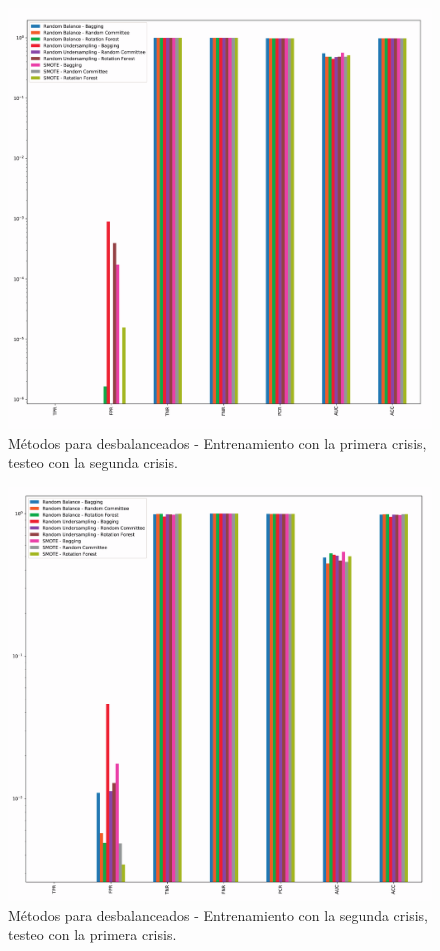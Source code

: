\documentclass[a4paper,12pt,twoside,oldfontcommands]{memoir}
\begin{document}
\begin{figure}
    \centering
    \includegraphics[width=1\textwidth]{images/desbal1.pdf}
    \caption{Métodos para desbalanceados - Entrenamiento con la primera crisis, testeo con la segunda crisis.}
    \label{fig:crisis1}
\end{figure}

\begin{figure}
    \centering
    \includegraphics[width=1\textwidth]{images/desbal2.pdf}
    \caption{Métodos para desbalanceados - Entrenamiento con la segunda crisis, testeo con la primera crisis.}
    \label{fig:crisis2}
\end{figure}
\end{document}

